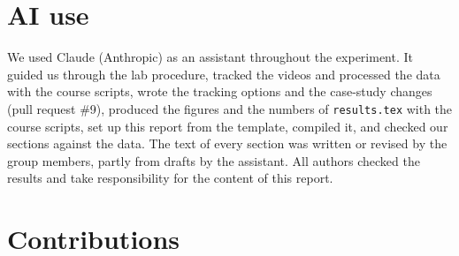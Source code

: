 \section*{AI use}
\label{sec:ai-use}

We used Claude (Anthropic) as an assistant throughout the experiment. It guided us through the lab procedure, tracked the videos and processed the data with the course scripts, wrote the tracking options and the case-study changes (pull request \#9), produced the figures and the numbers of \texttt{results.tex} with the course scripts, set up this report from the template, compiled it, and checked our sections against the data. The text of every section was written or revised by the group members, partly from drafts by the assistant. All authors checked the results and take responsibility for the content of this report.

\section*{Contributions}
\label{sec:contributions}

